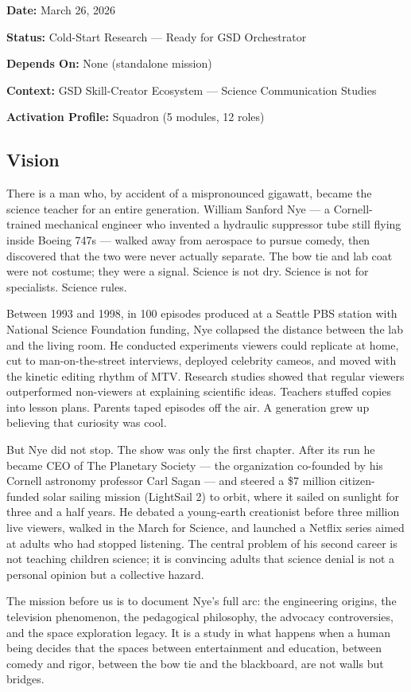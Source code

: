 \documentclass[11pt,letterpaper]{article}
\newcommand{\metafield}[2]{\textbf{\sffamily #1} #2\par}
\begin{document}
\metafield{Date:}{March 26, 2026}
\metafield{Status:}{Cold-Start Research --- Ready for GSD Orchestrator}
\metafield{Depends On:}{None (standalone mission)}
\metafield{Context:}{GSD Skill-Creator Ecosystem --- Science Communication Studies}
\metafield{Activation Profile:}{Squadron (5 modules, 12 roles)}

\subsection{Vision}

There is a man who, by accident of a mispronounced gigawatt, became the science teacher for an entire generation. William Sanford Nye --- a Cornell-trained mechanical engineer who invented a hydraulic suppressor tube still flying inside Boeing 747s --- walked away from aerospace to pursue comedy, then discovered that the two were never actually separate. The bow tie and lab coat were not costume; they were a signal. Science is not dry. Science is not for specialists. Science rules.

Between 1993 and 1998, in 100 episodes produced at a Seattle PBS station with National Science Foundation funding, Nye collapsed the distance between the lab and the living room. He conducted experiments viewers could replicate at home, cut to man-on-the-street interviews, deployed celebrity cameos, and moved with the kinetic editing rhythm of MTV. Research studies showed that regular viewers outperformed non-viewers at explaining scientific ideas. Teachers stuffed copies into lesson plans. Parents taped episodes off the air. A generation grew up believing that curiosity was cool.

But Nye did not stop. The show was only the first chapter. After its run he became CEO of The Planetary Society --- the organization co-founded by his Cornell astronomy professor Carl Sagan --- and steered a \$7 million citizen-funded solar sailing mission (LightSail 2) to orbit, where it sailed on sunlight for three and a half years. He debated a young-earth creationist before three million live viewers, walked in the March for Science, and launched a Netflix series aimed at adults who had stopped listening. The central problem of his second career is not teaching children science; it is convincing adults that science denial is not a personal opinion but a collective hazard.

The mission before us is to document Nye's full arc: the engineering origins, the television phenomenon, the pedagogical philosophy, the advocacy controversies, and the space exploration legacy. It is a study in what happens when a human being decides that the spaces between entertainment and education, between comedy and rigor, between the bow tie and the blackboard, are not walls but bridges.
\end{document}
